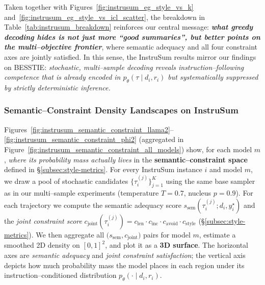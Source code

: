 Taken together with
Figures~\ref{fig:instrusum_eg_style_vs_k}
and~\ref{fig:instrusum_eg_style_vs_icl_scatter}, the breakdown in
Table~\ref{tab:instrusum_breakdown} reinforces our central message:
\emph{\textbf{what greedy decoding hides is not just more ``good
summaries'', but better points on the multi--objective frontier}}, where
semantic adequacy and all four constraint axes are jointly satisfied.
In this sense, the InstruSum results mirror our findings on BESSTIE:
\emph{stochastic, multi--sample decoding reveals instruction--following
competence that is already encoded in $p_\theta(\tau \mid d_i, r_i)$ but
systematically suppressed by strictly deterministic inference.}












\subsubsection{Semantic--Constraint Density Landscapes on InstruSum}
\label{subsec:semcon-landscapes}

Figures~\ref{fig:instrusum_semantic_constraint_llama2}--%
\ref{fig:instrusum_semantic_constraint_phi2}
(aggregated in
Figure~\ref{fig:instrusum_semantic_constraint_all_models})
show, for each model $m$, \emph{where its probability mass actually
lives} in the \textbf{semantic--constraint space} defined in
\S\ref{subsec:style-metrics}.  For every InstruSum instance $i$ and model
$m$, we draw a pool of stochastic candidates
$\{\tau_i^{(j)}\}_{j=1}^K$ using the same base sampler as in our
multi--sample experiments (temperature $T{=}0.7$, nucleus $p{=}0.9$).
For each trajectory we compute the semantic adequacy score
$s_{\text{sem}}(\tau_i^{(j)}; d_i, y_i^\star)$ and the
\emph{joint constraint score}
$c_{\text{joint}}(\tau_i^{(j)}) = c_{\text{len}} \cdot c_{\text{inc}}
\cdot c_{\text{avoid}} \cdot c_{\text{style}}$
(\S\ref{subsec:style-metrics}).  We then aggregate all
$\bigl(s_{\text{sem}}, c_{\text{joint}}\bigr)$ pairs for model $m$,
estimate a smoothed 2D density on $[0,1]^2$, and plot it as a
\textbf{3D surface}.  The horizontal axes are \emph{semantic adequacy}
and \emph{joint constraint satisfaction}; the vertical axis depicts how
much probability mass the model places in each region under its
instruction--conditioned distribution $p_\theta(\cdot \mid d_i,r_i)$.

